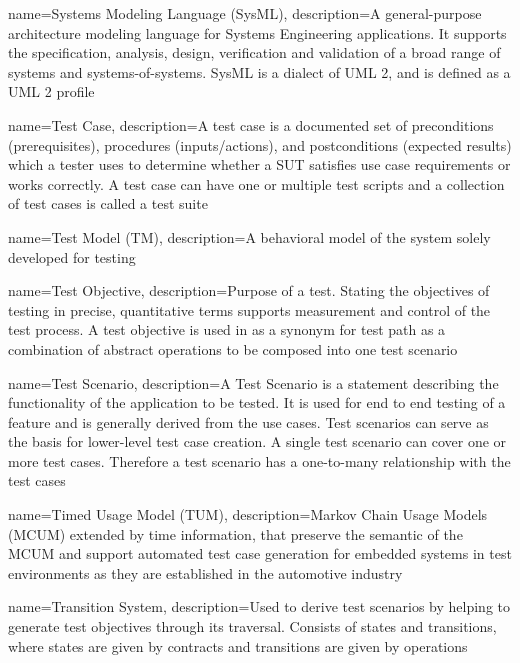 {
	name={Systems Modeling Language (SysML)},
	description={A general-purpose architecture modeling language for Systems Engineering applications. It supports the specification, analysis, design, verification and validation of a broad range of systems and systems-of-systems. SysML is a dialect of UML 2, and is defined as a UML 2 profile \cite{SysML}}
}

{
	name={Test Case},
	description={A test case is a documented set of preconditions (prerequisites), procedures (inputs/actions), and postconditions (expected results) which a tester uses to determine whether a SUT satisfies use case requirements or works correctly. A test case can have one or multiple test scripts and a collection of test cases is called a test suite \cite{STFTestCase}}
}

{
	name={Test Model (TM)},
	description={A behavioral model of the system solely developed for testing \cite{Paper1}}
}

{
	name={Test Objective},
	description={Purpose of a test. Stating the objectives of testing in precise, quantitative terms supports measurement and control of the test process. A test objective is used in \cite{ClementineNebut2006} as a synonym for test path as a combination of abstract operations to be composed into one test scenario \cite{SWEBOK, ClementineNebut2006}}
}

{
	name={Test Scenario},
	description={A Test Scenario is a statement describing the functionality of the application to be tested. It is used for end to end testing of a feature and is generally derived from the use cases. Test scenarios can serve as the basis for lower-level test case creation. A single test scenario can cover one or more test cases. Therefore a test scenario has a one-to-many relationship with the test cases \cite{AOTTestScenario}}
}

{
	name={Timed Usage Model (TUM)},
	description={Markov Chain Usage Models (MCUM) extended by time information, that preserve the semantic of the MCUM and support automated test case generation for embedded systems in test environments as they are established in the automotive industry \cite{Siegl2010}}
}

{
	name={Transition System},
	description={Used to derive test scenarios by helping to generate test objectives through its traversal. Consists of states and transitions, where states are given by contracts and transitions are given by operations \cite{ClementineNebut2006}}
}

